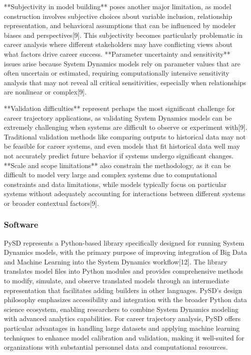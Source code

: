 \documentclass[main.tex]{subfiles}
\begin{document}
**Subjectivity in model building** poses another major limitation, as model construction involves subjective choices about variable inclusion, relationship representation, and behavioral assumptions that can be influenced by modeler biases and perspectives[9]. This subjectivity becomes particularly problematic in career analysis where different stakeholders may have conflicting views about what factors drive career success. **Parameter uncertainty and sensitivity** issues arise because System Dynamics models rely on parameter values that are often uncertain or estimated, requiring computationally intensive sensitivity analysis that may not reveal all critical sensitivities, especially when relationships are nonlinear or complex[9].

**Validation difficulties** represent perhaps the most significant challenge for career trajectory applications, as validating System Dynamics models can be extremely challenging when systems are difficult to observe or experiment with[9]. Traditional validation methods like comparing outputs to historical data may not be feasible for career systems, and even models that fit historical data well may not accurately predict future behavior if systems undergo significant changes. **Scale and scope limitations** also constrain the methodology, as it can be difficult to model very large and complex systems due to computational constraints and data limitations, while models typically focus on particular systems without adequately accounting for interactions between different systems or broader contextual factors[9].

\subsubsection{Software}


PySD represents a Python-based library specifically designed for running System Dynamics models, with the primary purpose of improving integration of Big Data and Machine Learning into the System Dynamics workflow[12]. The library translates model files into Python modules and provides comprehensive methods to modify, simulate, and observe translated models through an intermediate representation that facilitates adding builders in other languages. PySD's design philosophy emphasizes accessibility and integration with the broader Python data science ecosystem, enabling researchers to combine System Dynamics modeling with advanced analytics capabilities. For career trajectory analysis, PySD offers particular advantages in handling large datasets and applying machine learning techniques to enhance model calibration and validation, making it well-suited for organizations with substantial personnel data and computational resources.
\end{document}
